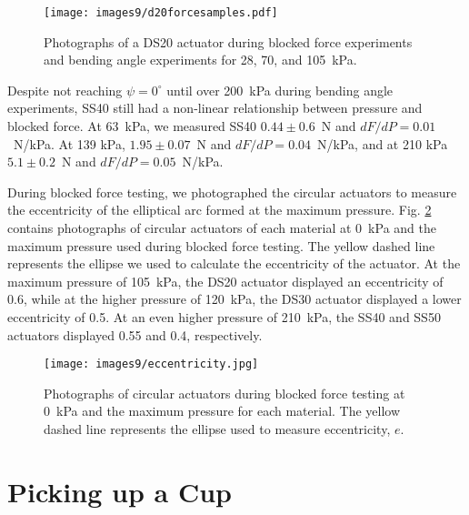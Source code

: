 \begin{figure}[!ht]
    \centering
     \texttt{[image: images9/d20forcesamples.pdf]}
    \caption{Photographs of a DS20 actuator during blocked force experiments and bending angle experiments for 28, 70, and 105~kPa.}
    \label{fig:d20force}
\end{figure}

Despite not reaching $\psi=0^\circ$ until over 200~kPa during bending angle experiments, SS40 still had a non-linear relationship between pressure and blocked force. At 63~kPa, we measured SS40 $0.44\pm0.6$~N and $dF/dP=0.01$~N/kPa. At 139 kPa, $1.95\pm0.07$~N and $dF/dP=0.04$~N/kPa, and at 210 kPa $5.1\pm0.2$~N and $dF/dP=0.05$~N/kPa. 

\clearpage
During blocked force testing, we photographed the circular actuators to measure the eccentricity of the elliptical arc formed at the maximum pressure. Fig. \ref{fig:eccentricity} contains photographs of circular actuators of each material at 0~kPa and the maximum pressure used during blocked force testing. The yellow dashed line represents the ellipse we used to calculate the eccentricity of the actuator. At the maximum pressure of 105~kPa, the DS20 actuator displayed an eccentricity of 0.6, while at the higher pressure of 120~kPa, the DS30 actuator displayed a lower eccentricity of 0.5. At an even higher pressure of 210~kPa, the SS40 and SS50 actuators displayed 0.55 and 0.4, respectively. 
\\
\begin{figure}[!ht]
    \centering
     \texttt{[image: images9/eccentricity.jpg]}
    \caption{Photographs of circular actuators during blocked force testing at 0~kPa and the maximum pressure for each material. The yellow dashed line represents the ellipse used to measure eccentricity, $e$.}
    \label{fig:eccentricity}
\end{figure}

\section{Picking up a Cup}

